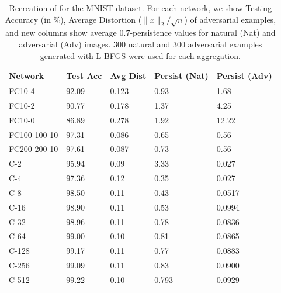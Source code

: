 \begin{table}[ht]
\centering
\caption{Recreation of \citet[Table 1]{szegedy2013} for the MNIST dataset.  For each network, we show Testing Accuracy (in \%), Average Distortion ($\|x\|_2/\sqrt{n}$) of adversarial examples, and new columns show average $0.7$-persistence values for natural (Nat) and adversarial (Adv) images. 300 natural and 300 adversarial examples generated with L-BFGS were used for each aggregation.}
\label{table1}
\begin{tabular}{lllll}
\toprule
Network & Test Acc & Avg Dist & Persist (Nat) & Persist (Adv) \\
\midrule
FC10-4 & 92.09 & 0.123 & 0.93 & 1.68\\
FC10-2 & 90.77 & 0.178 & 1.37 & 4.25\\
FC10-0 & 86.89 & 0.278 & 1.92 & 12.22\\
FC100-100-10 & 97.31 & 0.086 & 0.65 & 0.56 \\
FC200-200-10 & 97.61 & 0.087 & 0.73 & 0.56 \\
\midrule
C-2 & 95.94 & 0.09 & 3.33 & 0.027 \\
C-4 & 97.36 & 0.12 & 0.35 & 0.027 \\
C-8 & 98.50 & 0.11 & 0.43  & 0.0517 \\
C-16 & 98.90 & 0.11 & 0.53 & 0.0994 \\
C-32 & 98.96 & 0.11 & 0.78 & 0.0836 \\
C-64 & 99.00 & 0.10 & 0.81 & 0.0865 \\
C-128 & 99.17 & 0.11 & 0.77 & 0.0883 \\
C-256 & 99.09 & 0.11  & 0.83 & 0.0900 \\
C-512 & 99.22 & 0.10 & 0.793 & 0.0929 \\
\bottomrule
\end{tabular}
\end{table}

